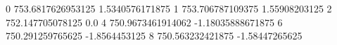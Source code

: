 0 753.6817626953125 1.5340576171875
1 753.706787109375 1.55908203125
2 752.147705078125 0.0
4 750.9673461914062 -1.18035888671875
6 750.291259765625 -1.8564453125
8 750.563232421875 -1.58447265625

